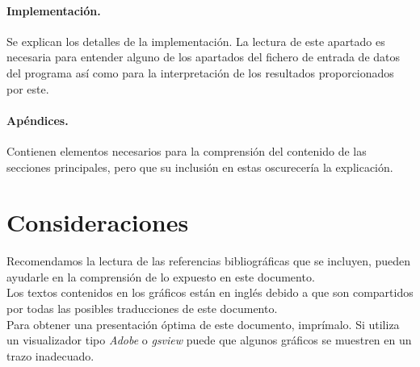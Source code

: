 \paragraph{Implementaci\'on.} Se explican los detalles de la implementaci\'on.
La lectura de este apartado es necesaria para entender alguno de los apartados
del fichero de entrada de datos del programa as\'i como para la interpretaci\'on
de los resultados proporcionados por este.

\paragraph{Ap\'endices.} Contienen elementos necesarios para la comprensi\'on
del contenido de las secciones principales, pero que su inclusi\'on en estas 
oscurecer\'ia la explicaci\'on.

\section{Consideraciones}

Recomendamos la lectura de las referencias bibliogr\'aficas que se incluyen, 
pueden ayudarle en la comprensi\'on de lo expuesto en este documento.\\

Los textos contenidos en los gr\'aficos est\'an en ingl\'es debido a que son 
compartidos por todas las posibles traducciones de este documento.\\

Para obtener una presentaci\'on \'optima de este documento, impr\'imalo. Si 
utiliza un visualizador tipo \emph{Adobe} o \emph{gsview} puede que algunos
gr\'aficos se muestren en un trazo inadecuado.

